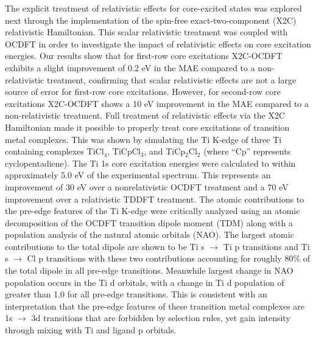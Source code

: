 \documentclass{article}
\begin{document}
The explicit treatment of relativistic effects for core-excited states was explored next through the implementation of the spin-free exact-two-component (X2C) relativistic Hamiltonian. This scalar relativistic treatment was coupled with OCDFT in order to investigate the impact of relativistic effects on core excitation energies. Our results show that for first-row core excitations X2C-OCDFT exhibits a slight improvement of 0.2 eV in the MAE compared to a non-relativistic treatment, confirming that scalar relativistic effects are not a large source of error for first-row core excitations. However, for second-row core excitations X2C-OCDFT shows a 10 eV improvement in the MAE compared to a non-relativistic treatment. Full treatment of relativistic effects via the X2C Hamiltonian made it possible to properly treat core excitations of transition metal complexes. This was shown by simulating the Ti K-edge of three Ti containing complexes TiCl$_4$, TiCpCl$_3$, and TiCp$_2$Cl$_2$ (where ``Cp'' represents cyclopentadiene). The Ti 1s core excitation energies were calculated to within approximately 5.0 eV of the experimental spectrum. This represents an improvement of 30 eV over a nonrelativistic OCDFT treatment and a 70 eV improvement over a relativistic TDDFT treatment. The atomic contributions to the pre-edge features of the Ti K-edge were critically analyzed using an atomic decomposition of the OCDFT transition dipole moment (TDM) along with a population analysis of the natural atomic orbitals (NAO). The largest atomic contributions to the total dipole are shown to be Ti s $\rightarrow$ Ti p transitions and Ti s $\rightarrow$ Cl p transitions with these two contributions accounting for roughly 80\% of the total dipole in all pre-edge transitions. Meanwhile largest change in NAO population occurs in the Ti d orbitals, with a change in Ti d population of greater than 1.0 for all pre-edge transitions. This is consistent with an interpretation that the pre-edge features of these transition metal complexes are 1s $\rightarrow$ 3d transitions that are forbidden by selection rules, yet gain intensity through mixing with Ti and ligand p orbitals. 
\end{document}
